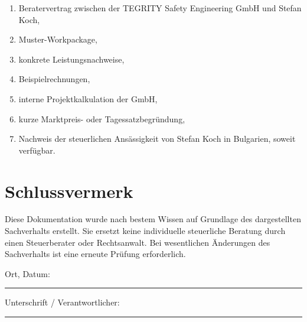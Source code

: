 \documentclass[11pt,a4paper]{article}
\begin{document}
\begin{enumerate}
    \item Beratervertrag zwischen der TEGRITY Safety Engineering GmbH und Stefan Koch,
    \item Muster-Workpackage,
    \item konkrete Leistungsnachweise,
    \item Beispielrechnungen,
    \item interne Projektkalkulation der GmbH,
    \item kurze Marktpreis- oder Tagessatzbegründung,
    \item Nachweis der steuerlichen Ansässigkeit von Stefan Koch in Bulgarien, soweit verfügbar.
\end{enumerate}

\section{Schlussvermerk}

Diese Dokumentation wurde nach bestem Wissen auf Grundlage des dargestellten Sachverhalts erstellt. Sie ersetzt keine individuelle steuerliche Beratung durch einen Steuerberater oder Rechtsanwalt. Bei wesentlichen Änderungen des Sachverhalts ist eine erneute Prüfung erforderlich.

\vspace{2em}

\noindent
Ort, Datum: \rule{0.35\textwidth}{0.4pt}

\vspace{2em}

\noindent
Unterschrift / Verantwortlicher: \rule{0.45\textwidth}{0.4pt}
\end{document}
